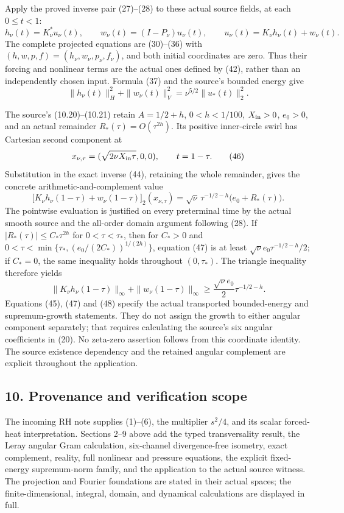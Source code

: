 Apply the proved inverse pair (27)--(28) to these actual source fields, at each \(0\le t<1\): \[
h_\nu(t)=K_\nu^*u_\nu(t),\qquad
w_\nu(t)=(I-P_\nu)u_\nu(t),\qquad
u_\nu(t)=K_\nu h_\nu(t)+w_\nu(t).
\tag{44}
\] The complete projected equations are (30)--(36) with \((h,w,p,f)=(h_\nu,w_\nu,p_\nu,f_\nu)\), and both initial coordinates are zero. Thus their forcing and nonlinear terms are the actual ones defined by (42), rather than an independently chosen input. Formula (37) and the source's bounded energy give \[
\|h_\nu(t)\|_H^2+\|w_\nu(t)\|_V^2
=\nu^{5/2}\|u_*(t)\|_2^2.
\tag{45}
\]

The source's (10.20)--(10.21) retain \(A=1/2+h\), \(0<h<1/100\), \(X_{\rm in}>0\), \(e_0>0\), and an actual remainder \(R_*(\tau)=O(\tau^{2h})\). Its positive inner-circle swirl has Cartesian second component at \[
x_{\nu,\tau}=(\sqrt{2\nu X_{\rm in}\tau},0,0),\qquad t=1-\tau.
\tag{46}
\] Substitution in the exact inverse (44), retaining the whole remainder, gives the concrete arithmetic-and-complement value \[
\big[K_\nu h_\nu(1-\tau)+w_\nu(1-\tau)\big]_2(x_{\nu,\tau})
=\sqrt\nu\,\tau^{-1/2-h}\big(e_0+R_*(\tau)\big).
\tag{47}
\] The pointwise evaluation is justified on every preterminal time by the actual smooth source and the all-order domain argument following (28). If \(|R_*(\tau)|\le C_*\tau^{2h}\) for \(0<\tau<\tau_*\), then for \(C_*>0\) and \(0<\tau<\min\{\tau_*,(e_0/(2C_*))^{1/(2h)}\}\), equation (47) is at least \(\sqrt\nu e_0\tau^{-1/2-h}/2\); if \(C_*=0\), the same inequality holds throughout \((0,\tau_*)\). The triangle inequality therefore yields \[
\|K_\nu h_\nu(1-\tau)\|_\infty+\|w_\nu(1-\tau)\|_\infty
\ge \frac{\sqrt\nu e_0}{2}\tau^{-1/2-h}.
\tag{48}
\] Equations (45), (47) and (48) specify the actual transported bounded-energy and supremum-growth statements. They do not assign the growth to either angular component separately; that requires calculating the source's six angular coefficients in (20). No zeta-zero assertion follows from this coordinate identity. The source existence dependency and the retained angular complement are explicit throughout the application.

\subsection*{10. Provenance and verification scope}

The incoming RH note supplies (1)--(6), the multiplier \(s^2/4\), and its scalar forced-heat interpretation. Sections 2--9 above add the typed transversality result, the Leray angular Gram calculation, six-channel divergence-free isometry, exact complement, reality, full nonlinear and pressure equations, the explicit fixed-energy supremum-norm family, and the application to the actual source witness. The projection and Fourier foundations are stated in their actual spaces; the finite-dimensional, integral, domain, and dynamical calculations are displayed in full.

